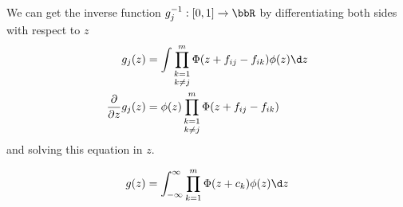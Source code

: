 We can get the inverse function $g_j^{-1}:[0,1] \to \bbR$ by differentiating both sides with respect to $z$
\begin{align*}
  g_j(z) &= \int \mathop{\prod_{k=1}^m}_{k\neq j} \Phi(z + f_{ij} - f_{ik}) \phi(z) \d z \\
  \frac{\partial}{\partial z} g_j(z) &= \phi(z) \mathop{\prod_{k=1}^m}_{k\neq j} \Phi(z + f_{ij} - f_{ik})
\end{align*}
and solving this equation in $z$.

\[
    g(z) = \int_{-\infty}^\infty \mathop{\prod_{k=1}^m} \Phi(z + c_k) \phi(z) \d z 
\]

